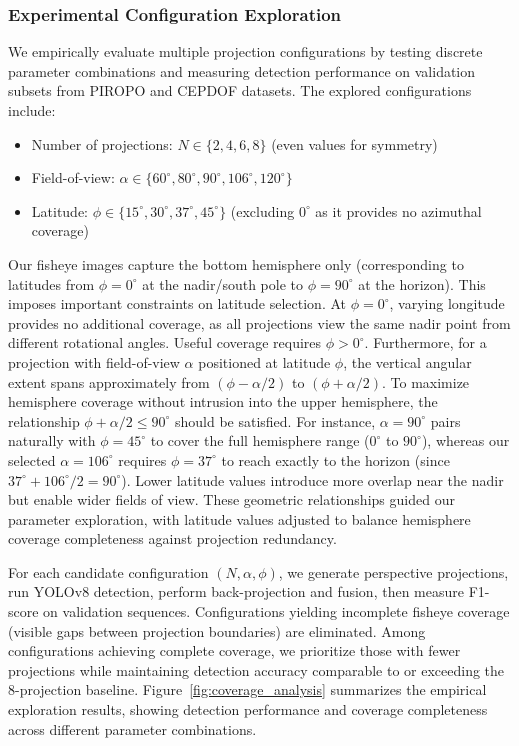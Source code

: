 \documentclass[twocolumn]{svjour3}          %
\begin{document}
\subsubsection{Experimental Configuration Exploration}

We empirically evaluate multiple projection configurations by testing discrete parameter combinations and measuring detection performance on validation subsets from PIROPO and CEPDOF datasets. The explored configurations include:

\begin{itemize}
	\item Number of projections: $N \in \{2, 4, 6, 8\}$ (even values for symmetry)
	\item Field-of-view: $\alpha \in \{60^\circ, 80^\circ, 90^\circ, 106^\circ, 120^\circ\}$
	\item Latitude: $\phi \in \{15^\circ, 30^\circ, 37^\circ, 45^\circ\}$ (excluding $0^\circ$ as it provides no azimuthal coverage)
\end{itemize}

Our fisheye images capture the bottom hemisphere only (corresponding to latitudes from $\phi=0^\circ$ at the nadir/south pole to $\phi=90^\circ$ at the horizon). This imposes important constraints on latitude selection. At $\phi=0^\circ$, varying longitude provides no additional coverage, as all projections view the same nadir point from different rotational angles. Useful coverage requires $\phi > 0^\circ$. Furthermore, for a projection with field-of-view $\alpha$ positioned at latitude $\phi$, the vertical angular extent spans approximately from $(\phi - \alpha/2)$ to $(\phi + \alpha/2)$. To maximize hemisphere coverage without intrusion into the upper hemisphere, the relationship $\phi + \alpha/2 \leq 90^\circ$ should be satisfied. For instance, $\alpha=90^\circ$ pairs naturally with $\phi=45^\circ$ to cover the full hemisphere range ($0^\circ$ to $90^\circ$), whereas our selected $\alpha=106^\circ$ requires $\phi=37^\circ$ to reach exactly to the horizon (since $37^\circ + 106^\circ/2 = 90^\circ$). Lower latitude values introduce more overlap near the nadir but enable wider fields of view. These geometric relationships guided our parameter exploration, with latitude values adjusted to balance hemisphere coverage completeness against projection redundancy.

For each candidate configuration $(N, \alpha, \phi)$, we generate perspective projections, run YOLOv8 detection, perform back-projection and fusion, then measure F1-score on validation sequences. Configurations yielding incomplete fisheye coverage (visible gaps between projection boundaries) are eliminated. Among configurations achieving complete coverage, we prioritize those with fewer projections while maintaining detection accuracy comparable to or exceeding the 8-projection baseline. Figure~\ref{fig:coverage_analysis} summarizes the empirical exploration results, showing detection performance and coverage completeness across different parameter combinations.
\end{document}

